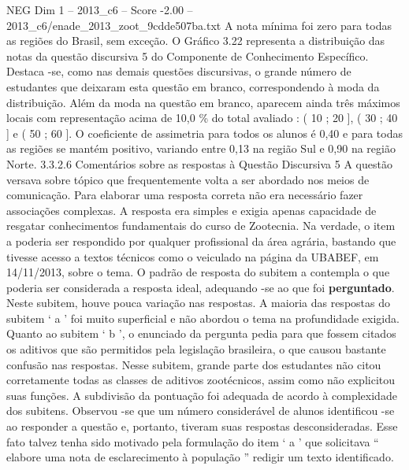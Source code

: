 \begin{textsample}{NEG Dim 1 – 2013\_c6 – Score -2.00 – 2013\_c6/enade\_2013\_zoot\_9cdde507ba.txt}
A nota mínima foi zero para todas as regiões do Brasil, sem exceção.
O Gráfico 3.22 representa a distribuição das notas da questão discursiva 5 do Componente de Conhecimento Específico.
Destaca -se, como nas demais questões discursivas, o grande número de estudantes que deixaram esta questão em branco, correspondendo à moda da distribuição.
Além da moda na questão em branco, aparecem ainda três máximos locais com representação acima de 10,0 \% do total avaliado : ( 10 ; 20 ], ( 30 ; 40 ] e ( 50 ; 60 ].
O coeficiente de assimetria para todos os alunos é 0,40 e para todas as regiões se mantém positivo, variando entre 0,13 na região Sul e 0,90 na região Norte. 3.3.2.6 Comentários sobre as respostas à Questão Discursiva 5 A questão versava sobre tópico que frequentemente volta a ser abordado nos meios de comunicação.
Para elaborar uma resposta correta não era necessário fazer associações complexas.
A resposta era simples e exigia apenas capacidade de resgatar conhecimentos fundamentais do curso de Zootecnia.
Na verdade, o item a poderia ser respondido por qualquer profissional da área agrária, bastando que tivesse acesso a textos técnicos como o veiculado na página da UBABEF, em 14/11/2013, sobre o tema.
O padrão de resposta do subitem a contempla o que poderia ser considerada a resposta ideal, adequando -se ao que foi \textbf{perguntado}.
Neste subitem, houve pouca variação nas respostas.
A maioria das respostas do subitem ‘ a ’ foi muito superficial e não abordou o tema na profundidade exigida.
Quanto ao subitem ‘ b ’, o enunciado da pergunta pedia para que fossem citados os aditivos que são permitidos pela legislação brasileira, o que causou bastante confusão nas respostas.
Nesse subitem, grande parte dos estudantes não citou corretamente todas as classes de aditivos zootécnicos, assim como não explicitou suas funções.
A subdivisão da pontuação foi adequada de acordo à complexidade dos subitens.
Observou -se que um número considerável de alunos identificou -se ao responder a questão e, portanto, tiveram suas respostas desconsideradas.
Esse fato talvez tenha sido motivado pela formulação do item ‘ a ’ que solicitava “ elabore uma nota de esclarecimento à população ” redigir um texto identificado.

\end{textsample}

